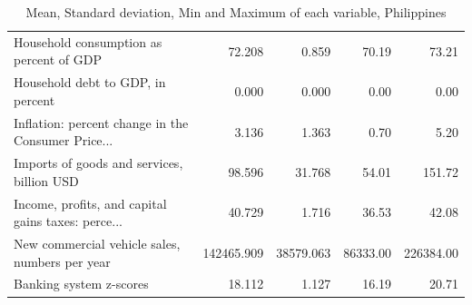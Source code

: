 \documentclass[11pt]{article}
\begin{document}
\begin{table}[H]
{\begin{tabular}{lrrrr}
Household consumption as percent of GDP            &      72.208 &      0.859 &     70.19 &      73.21 \\
Household debt to GDP, in percent                  &       0.000 &      0.000 &      0.00 &       0.00 \\
Inflation: percent change in the Consumer Price... &       3.136 &      1.363 &      0.70 &       5.20 \\
Imports of goods and services, billion USD         &      98.596 &     31.768 &     54.01 &     151.72 \\
Income, profits, and capital gains taxes: perce... &      40.729 &      1.716 &     36.53 &      42.08 \\
New commercial vehicle sales, numbers per year     &  142465.909 &  38579.063 &  86333.00 &  226384.00 \\
Banking system z-scores                            &      18.112 &      1.127 &     16.19 &      20.71 \\
\bottomrule
\end{tabular}}
\caption{Mean, Standard deviation, Min and Maximum of each variable, Philippines}
\label{tab:describe_phl}
\end{table}
\end{document}
